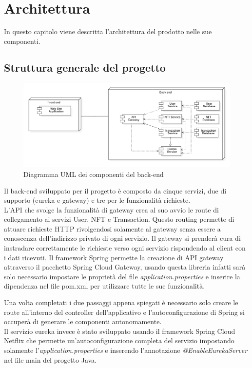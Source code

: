 \chapter{Architettura}
In questo capitolo viene descritta l'architettura del prodotto nelle sue componenti.
\section{Struttura generale del progetto}
\begin{center}
	\begin{figure}[H]
		\centering\includegraphics[scale=0.65]{./immagini/componentNFTLab.png}
		\caption{Diagramma UML dei componenti del back-end}
	\end{figure}
\end{center}
Il back-end sviluppato per il progetto è composto da cinque servizi, due di supporto (eureka e gateway) e tre per le funzionalità richieste. \\
L'API che svolge la funzionalità di gateway crea al suo avvio le route di collegamento ai servizi User, NFT e Transaction. Questo routing permette di attuare richieste HTTP rivolgendosi solamente al gateway senza essere a conoscenza dell'indirizzo privato di ogni servizio. Il gateway si prenderà cura di instradare correttamente le richieste verso ogni servizio rispondendo al client con i dati ricevuti. Il framework Spring permette la creazione di API gateway attraverso il pacchetto Spring Cloud Gateway, usando questa libreria infatti sarà solo necessario impostare le proprietà del file \emph{application.properties} e inserire la dipendenza nel file pom.xml per utilizzare tutte le sue funzionalità.

Una volta completati i due passaggi appena spiegati è necessario solo creare le route all'interno del controller dell'applicativo e l'autoconfigurazione di Spring si occuperà di generare le componenti autonomamente.
\\
Il servizio eureka invece è stato sviluppato usando il framework Spring Cloud Netflix che permette un'autoconfigurazione completa del servizio impostando solamente l'\emph{application.properties} e inserendo l'annotazione \emph{@EnableEurekaServer} nel file main del progetto Java.

